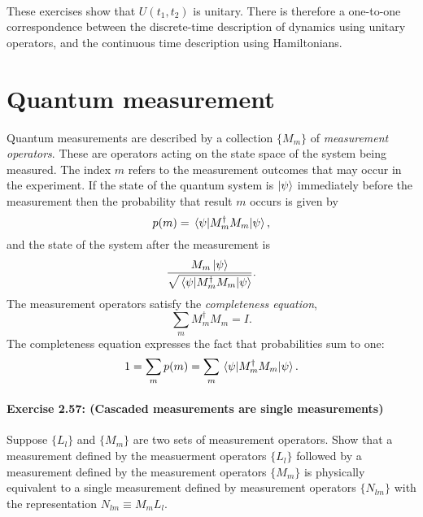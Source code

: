 \paragraph{}

These exercises show that $U(t_1, t_2)$ is unitary. There is therefore a
one-to-one correspondence between the discrete-time description of dynamics
using unitary operators, and the continuous time description using
Hamiltonians.

\section{Quantum measurement}

\begin{postulate}
  Quantum measurements are described by a collection $\{M_m\}$ of
  \emph{measurement operators}. These are operators acting on the state space
  of the system being measured. The index $m$ refers to the measurement
  outcomes that may occur in the experiment. If the state of the quantum
  system is $\ket{\psi}$ immediately before the measurement then the
  probability that result $m$ occurs is given by \begin{equation*}
    p(m) = \mel{\psi}{M_m^\dagger M_m}{\psi},
  \end{equation*} and the state of the system after the measurement is
  \begin{equation*}
    \frac{M_m\ket{\psi}}{\sqrt{\mel{\psi}{M_m^\dagger M_m}{\psi}}}.
  \end{equation*}
  The measurement operators satisfy the \emph{completeness equation},
  \begin{equation*}
    \sum_m M_m^\dagger M_m = I.
  \end{equation*}
  The completeness equation expresses the fact that probabilities sum to one:
  \begin{equation*}
    1 = \sum_mp(m) = \sum_m\mel{\psi}{M_m^\dagger M_m}{\psi}.
  \end{equation*}
\end{postulate}

\paragraph{\cite{mikeandike} Exercise 2.57: (Cascaded measurements are single
measurements)} Suppose $\{L_l\}$ and $\{M_m\}$ are two sets of measurement
operators. Show that a measurement defined by the measuerment operators
$\{L_l\}$ followed by a measurement defined by the measurement operators
$\{M_m\}$ is physically equivalent to a single measurement defined by
measurement operators $\{N_{lm}\}$ with the representation $N_{lm} \equiv M_m
L_l$.


